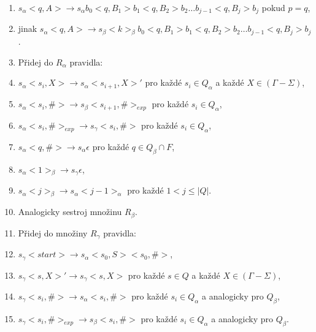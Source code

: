 \begin{Alg}
\begin{list}{}{\setlength\parsep{0cm} \setlength\itemsep{0cm} \setlength\leftmargin{1em}}
\begin{enumerate}
\renewcommand{\labelenumi}{(\roman{enumi})}

   \item  $s_\alpha <q, A> \rightarrow s_\alpha b_0 <q, B_1> b_1 <q, B_2> b_2 \dots b_{j-1} <q, B_j> b_j$ pokud $p = q$,
   \item jinak $s_\alpha <q, A> \rightarrow s_\beta <k>_\beta b_0 <q, B_1> b_1 <q, B_2> b_2 \dots b_{j-1} <q, B_j> b_j$. 


   \item Přidej do $R_\alpha$ pravidla:

\renewcommand{\labelenumi}{(\roman{enumi})}

   \item $s_\alpha <s_i, X> \rightarrow s_\alpha <s_{i+1}, X>'$ pro každé $s_i \in Q_\alpha$ a každé $X \in (\Gamma - \Sigma)$,
   \item $s_\alpha <s_i, \#> \rightarrow s_\beta <s_{i+1}, \#>_{exp}$ pro každé $s_i \in Q_\alpha$,
   \item $s_\alpha <s_i, \#>_{exp} \rightarrow s_\gamma <s_{i}, \#>$ pro každé $s_i \in Q_\alpha$,
   \item $s_\alpha <q, \#> \rightarrow s_\alpha \epsilon $ pro každé $q \in Q_\beta \cap F$,
   \item $s_\alpha <1>_{\beta} \rightarrow s_\gamma \epsilon $,
   \item $s_\alpha <j>_{\beta} \rightarrow s_\alpha <j - 1 >_\alpha $ pro každé $1 < j \le |Q|$.


   \item Analogicky sestroj množinu $R_\beta.$ \medskip

   \item Přidej do množiny $R_\gamma$ pravidla:

\renewcommand{\labelenumi}{(\roman{enumi})}

   \item $s_\gamma <start> \rightarrow s_\alpha <s_0, S> <s_0, \#>$,
   \item $s_\gamma <s, X>' \rightarrow s_\gamma <s, X> $ pro každé $s \in Q$ a každé $X \in (\Gamma - \Sigma)$,
   \item $s_\gamma <s_i, \#> \rightarrow s_\alpha <s_i, \#>$ pro každé $s_i \in Q_\alpha$ a analogicky pro $Q_\beta$,
   \item $s_\gamma <s_i, \#>_{exp} \rightarrow s_\beta <s_{i}, \#>$ pro každé $s_i \in Q_\alpha$ a analogicky pro $Q_\beta$.

\end{enumerate}

\end{list}
\end{Alg}




